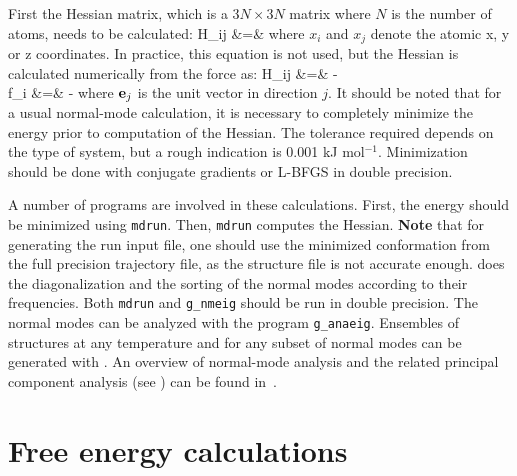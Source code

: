 First the Hessian matrix, which is a $3N \times 3N$ matrix where $N$
is the number of atoms, needs to be calculated:
\bea
H_{ij}  &=&     
\eea
where $x_i$ and $x_j$ denote the atomic x, y or z coordinates.
In practice, this equation is not used, but the Hessian is
calculated numerically from the force as:
\bea
H_{ij} &=& -
\\
f_i     &=& - 
\eea
where ${\bf e}_j$ is the unit vector in direction $j$.
It should be noted that
for a usual normal-mode calculation, it is necessary to completely minimize 
the energy prior to computation of the Hessian.
The tolerance required depends on the type of system,
but a rough indication is 0.001 kJ mol$^{-1}$.
Minimization should be done with conjugate gradients or L-BFGS in double precision.

A number of {\gromacs} programs are involved in these
calculations. First, the energy should be minimized using {\tt mdrun}.
Then, {\tt mdrun} computes the Hessian.  {\bf Note} that for generating
the run input file, one should use the minimized conformation from
the full precision trajectory file, as the structure file is not
accurate enough.
{\tt {}} does the diagonalization and
the sorting of the normal modes according to their frequencies.
Both {\tt mdrun} and {\tt g_nmeig} should be run in double precision.
The normal modes can be analyzed with the program {\tt g_anaeig}.
Ensembles of structures at any temperature and for any subset of
normal modes can be generated with {\tt {}}.
An overview of normal-mode analysis and the related principal component
analysis (see ) can be found in~\cite{Hayward95b}.


\section{Free energy calculations}
\label{sec:fecalc}
